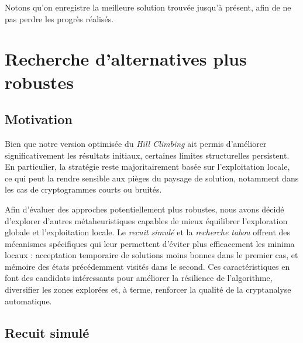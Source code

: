 \documentclass[a4paper]{article}
\begin{document}
Notons qu'on enregistre la meilleure solution trouvée jusqu'à présent, afin de ne pas perdre les progrès réalisés.

\section{Recherche d’alternatives plus robustes}

\subsection{Motivation}


Bien que notre version optimisée du \textit{Hill Climbing} ait permis d'améliorer significativement les résultats initiaux, certaines limites structurelles persistent. En particulier, la stratégie reste majoritairement basée sur l’exploitation locale, ce qui peut la rendre sensible aux pièges du paysage de solution, notamment dans les cas de cryptogrammes courts ou bruités.

Afin d’évaluer des approches potentiellement plus robustes, nous avons décidé d'explorer d'autres métaheuristiques capables de mieux équilibrer l'exploration globale et l'exploitation locale. Le \textit{recuit simulé} et la \textit{recherche tabou} offrent des mécanismes spécifiques qui leur permettent d’éviter plus efficacement les minima locaux : acceptation temporaire de solutions moins bonnes dans le premier cas, et mémoire des états précédemment visités dans le second. Ces caractéristiques en font des candidats intéressants pour améliorer la résilience de l’algorithme, diversifier les zones explorées et, à terme, renforcer la qualité de la cryptanalyse automatique.



\subsection{Recuit simulé}
\end{document}
